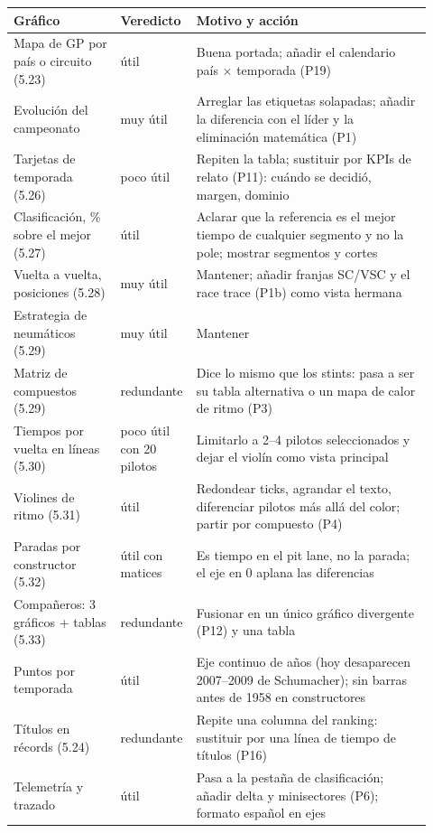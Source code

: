 \documentclass[11pt,openany]{report}
\begin{document}
\begin{center}\small
\begin{longtable}{@{}>{\raggedright\arraybackslash}p{0.25\linewidth}>{\raggedright\arraybackslash}p{0.12\linewidth}>{\raggedright\arraybackslash}p{0.55\linewidth}@{}}
\toprule
\textbf{Gráfico} & \textbf{Veredicto} & \textbf{Motivo y acción} \\
\midrule\endhead
\bottomrule\endlastfoot
Mapa de GP por país o circuito (5.23) & útil & Buena portada; añadir el calendario país × temporada (P19) \\
Evolución del campeonato & muy útil & Arreglar las etiquetas solapadas; añadir la diferencia con el líder y la eliminación matemática (P1) \\
Tarjetas de temporada (5.26) & poco útil & Repiten la tabla; sustituir por KPIs de relato (P11): cuándo se decidió, margen, dominio \\
Clasificación, \% sobre el mejor (5.27) & útil & Aclarar que la referencia es el mejor tiempo de cualquier segmento y no la pole; mostrar segmentos y cortes \\
Vuelta a vuelta, posiciones (5.28) & muy útil & Mantener; añadir franjas SC/VSC y el race trace (P1b) como vista hermana \\
Estrategia de neumáticos (5.29) & muy útil & Mantener \\
Matriz de compuestos (5.29) & redundante & Dice lo mismo que los stints: pasa a ser su tabla alternativa o un mapa de calor de ritmo (P3) \\
Tiempos por vuelta en líneas (5.30) & poco útil con 20 pilotos & Limitarlo a 2–4 pilotos seleccionados y dejar el violín como vista principal \\
Violines de ritmo (5.31) & útil & Redondear ticks, agrandar el texto, diferenciar pilotos más allá del color; partir por compuesto (P4) \\
Paradas por constructor (5.32) & útil con matices & Es tiempo en el pit lane, no la parada; el eje en 0 aplana las diferencias \\
Compañeros: 3 gráficos + tablas (5.33) & redundante & Fusionar en un único gráfico divergente (P12) y una tabla \\
Puntos por temporada & útil & Eje continuo de años (hoy desaparecen 2007–2009 de Schumacher); sin barras antes de 1958 en constructores \\
Títulos en récords (5.24) & redundante & Repite una columna del ranking: sustituir por una línea de tiempo de títulos (P16) \\
Telemetría y trazado & útil & Pasa a la pestaña de clasificación; añadir delta y minisectores (P6); formato español en ejes \\
\end{longtable}
\end{center}
\end{document}
